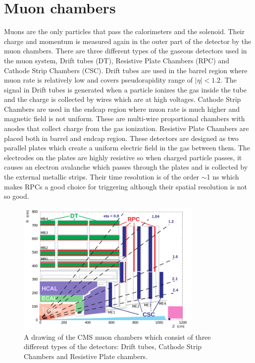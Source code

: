 
\section{Muon chambers}

Muons are the only particles that pass the calorimeters and the solenoid. Their charge and momentum is measured again in the outer part of the detector by the muon chambers. There are three different types of the gaseous detectors used in the muon system, Drift tubes (DT), Resistive Plate Chambers (RPC) and Cathode Strip Chambers (CSC). Drift tubes are used in the barrel region where muon rate is relatively low and covers pseudorapidity range of $|\eta|<1.2$. The signal in Drift tubes is generated when a particle ionizes the gas inside the tube and the charge is collected by wires which are at high voltages. Cathode Strip Chambers are used in the endcap region where muon rate is much higher and magnetic field is not uniform. These are multi-wire proportional chambers with anodes that collect charge from the gas ionization. Resistive Plate Chambers are placed both in barrel and endcap region. These detectors are designed as two parallel plates which create a uniform electric field in the gas between them. The electrodes on the plates are highly resistive so  when charged particle passes, it causes an electron avalanche which passes through the plates and is collected by the external metallic strips. Their time resolution is of the order $\sim$1 ns which makes RPCs a good choice for triggering although their spatial resolution is not so good.
\begin{figure}[htbp]
	\centering
		\includegraphics[width=0.8\textwidth]{Figures/Muon_chambres.png}
	\caption[CMS Muon Chambers]{A drawing of the CMS muon chambers which consist of three different types of the detectors: Drift tubes, Cathode Strip Chambers and Resistive Plate chambers. \cite{Chatrchyan:2008aa}}
	\label{fig:Mu}
\end{figure} 
 
